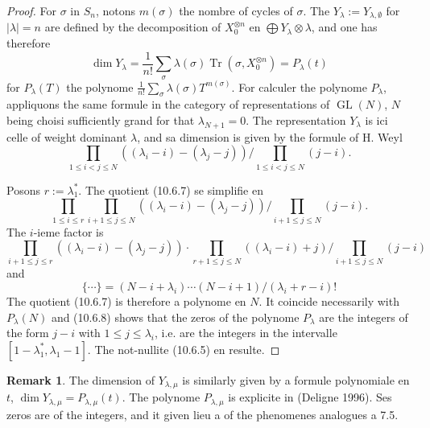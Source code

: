 \documentclass[11pt,a4paper]{article}
\theoremstyle{plain}
\theoremstyle{definition}
\newtheorem{remark}[theorem]{Remark}
\DeclareMathOperator{\Tr}{Tr}
\DeclareMathOperator{\GL}{GL}
\begin{document}
\begin{proof}
For $\sigma$ in $S_n$, notons $m(\sigma)$ the nombre of cycles of $\sigma$. The $Y_\lambda := Y_{\lambda, \emptyset}$ for $|\lambda| = n$ are defined by the decomposition of $X_0^{\otimes n}$ en $\bigoplus Y_\lambda \otimes \lambda$, and one has therefore
\begin{equation}
\dim Y_\lambda = \frac{1}{n!} \sum_\sigma \lambda(\sigma) \Tr(\sigma, X_0^{\otimes n}) = P_\lambda(t) \tag{10.6.6}
\end{equation}
for $P_\lambda(T)$ the polynome $\frac{1}{n!} \sum_\sigma \lambda(\sigma) T^{m(\sigma)}$. For calculer the polynome $P_\lambda$, appliquons the same formule in the category of representations of $\GL(N)$, $N$ being choisi sufficiently grand for that $\lambda_{N+1} = 0$. The representation $Y_\lambda$ is ici celle of weight dominant $\lambda$, and sa dimension is given by the formule of H. Weyl
\begin{equation}
\prod_{1 \leq i < j \leq N} ((\lambda_i - i) - (\lambda_j - j)) \Big/ \prod_{1 \leq i < j \leq N} (j - i). \tag{10.6.7}
\end{equation}

Posons $r := \lambda^*_1$. The quotient (10.6.7) se simplifie en
\begin{equation}
\prod_{1 \leq i \leq r} \prod_{i+1 \leq j \leq N} ((\lambda_i - i) - (\lambda_j - j)) \Big/ \prod_{i+1 \leq j \leq N} (j - i). \tag{10.6.8}
\end{equation}
The $i$-ieme factor is
\[
\prod_{i+1 \leq j \leq r} ((\lambda_i - i) - (\lambda_j - j)) \cdot \prod_{r+1 \leq j \leq N} ((\lambda_i - i) + j) \Big/ \prod_{i+1 \leq j \leq N} (j - i)
\]
and
\[
\{ \cdots \} = (N - i + \lambda_i) \cdots (N - i + 1) / (\lambda_i + r - i)!
\]
The quotient (10.6.7) is therefore a polynome en $N$. It coincide necessarily with $P_\lambda(N)$ and (10.6.8) shows that the zeros of the polynome $P_\lambda$ are the integers of the form $j - i$ with $1 \leq j \leq \lambda_i$, i.e. are the integers in the intervalle $[1 - \lambda^*_1, \lambda_1 - 1]$. The not-nullite (10.6.5) en resulte.
\end{proof}

\begin{remark}
The dimension of $Y_{\lambda, \mu}$ is similarly given by a formule polynomiale en $t$, $\dim Y_{\lambda, \mu} = P_{\lambda, \mu}(t)$. The polynome $P_{\lambda, \mu}$ is explicite in (Deligne 1996). Ses zeros are of the integers, and it given lieu a of the phenomenes analogues a 7.5.
\end{remark}
\end{document}
